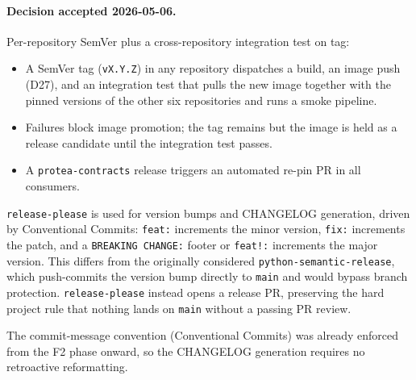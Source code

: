 \paragraph{Decision accepted 2026-05-06.}
Per-repository SemVer plus a cross-repository integration test on tag:

\begin{itemize}
  \item A SemVer tag (\texttt{vX.Y.Z}) in any repository dispatches a build,
    an image push (D27), and an integration test that pulls the new image
    together with the pinned versions of the other six repositories and runs
    a smoke pipeline.
  \item Failures block image promotion; the tag remains but the image is
    held as a release candidate until the integration test passes.
  \item A \texttt{protea-contracts} release triggers an automated re-pin PR
    in all consumers.
\end{itemize}

\texttt{release-please} is used for version bumps and CHANGELOG generation,
driven by Conventional Commits: \texttt{feat:} increments the minor version,
\texttt{fix:} increments the patch, and a \texttt{BREAKING CHANGE:} footer or
\texttt{feat!:} increments the major version. This differs from the originally
considered \texttt{python-semantic-release}, which push-commits the version
bump directly to \texttt{main} and would bypass branch protection.
\texttt{release-please} instead opens a release PR, preserving the hard project
rule that nothing lands on \texttt{main} without a passing PR review.

The commit-message convention (Conventional Commits) was already enforced from
the F2 phase onward, so the CHANGELOG generation requires no retroactive
reformatting.

